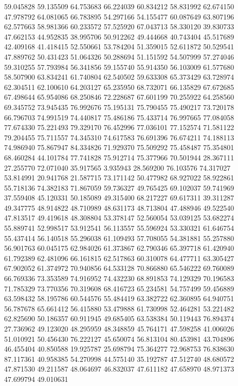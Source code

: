 59.045828
59.135509
64.753683
66.224039
60.834212
58.831992
62.674150
47.978792
64.081065
66.783895
54.297166
54.155477
60.087649
63.807196
62.577663
58.981366
60.233572
57.525920
67.043713
58.330120
39.830733
47.662153
44.952835
38.995706
50.912262
49.444668
40.743404
45.517689
42.409168
41.418415
52.550661
53.784204
51.359015
52.611872
50.529541
47.889762
50.431423
51.064326
50.288694
51.151592
54.507999
57.274046
59.310255
57.793984
56.341856
59.155740
55.914350
56.103009
61.577680
58.507900
63.834241
61.740804
62.540502
59.633308
65.373429
63.728974
62.304511
62.100610
64.203127
65.235950
68.732071
66.135829
67.672685
67.498644
65.954086
68.250846
72.228687
67.601199
70.255922
64.258560
69.345752
73.945435
76.992676
75.195131
75.790455
75.490217
73.720178
66.796703
74.991519
74.440817
75.486186
75.433714
76.997665
77.084058
77.674330
75.221493
79.329170
76.452996
77.036101
77.152574
71.581122
79.204455
75.711557
74.345310
74.617583
76.691396
76.674211
74.188113
74.986940
75.867947
84.334826
71.929370
75.509292
75.458487
75.354801
68.460284
44.101784
77.741828
75.912714
75.377966
70.501944
28.367111
27.255770
72.071040
35.917565
3.935943
28.569200
76.103576
74.317027
53.814991
20.941768
21.587715
73.171142
50.477982
68.927022
58.922861
55.718136
74.382183
71.867059
59.736327
49.765425
69.102037
59.741969
37.559408
45.120331
50.185089
49.315400
68.217227
69.617311
39.311287
49.347775
48.914822
48.710989
48.631173
48.713804
47.488946
49.522540
47.813517
49.419618
48.308804
53.378147
52.560054
53.039125
53.682274
55.889741
52.998517
53.912541
56.113557
55.596924
53.330321
61.646754
55.437414
56.140518
55.296038
61.109493
57.708055
54.381881
55.257880
56.901763
60.045175
62.984026
61.373867
62.790346
65.397718
61.420940
61.792389
62.481096
66.161815
62.517863
60.310078
64.477711
63.305427
67.902052
61.374972
70.940856
64.533128
70.866880
65.546222
69.760089
66.769336
73.353589
74.916952
74.432230
68.891853
74.129329
70.196583
71.785329
73.770356
70.319608
68.416723
65.234581
54.757499
59.456889
63.598432
58.195786
60.544576
55.484419
63.382722
62.360895
64.940751
56.787678
65.661412
56.415880
53.479888
61.730998
52.464281
53.221482
62.825690
50.186357
60.911945
49.685405
63.538384
50.119443
76.894374
27.736962
49.123020
48.295959
48.348859
45.764171
47.598258
41.006026
51.010921
50.456430
76.222127
45.650074
56.813104
80.453981
43.704896
46.455404
40.850588
19.925787
25.698794
75.364277
72.968753
76.838630
87.117361
40.958385
54.270998
44.575140
35.192787
47.512740
48.680572
47.871530
49.211587
48.064697
46.832037
47.611182
47.658970
48.971373
47.699794
49.010631
